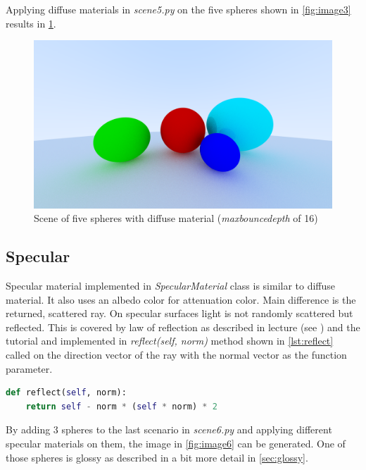 \documentclass[]{article}
\begin{document}
		Applying diffuse materials in \emph{scene5.py} on the five spheres shown in \cref{fig:image3} results in \cref{fig:image5}.
		
		\begin{figure}[h]
			\centering
			\includegraphics[width=0.9\linewidth]{image5-5}
			\caption{Scene of five spheres with diffuse material (\emph{max\textunderscore bounce\textunderscore depth} of 16)}
			\label{fig:image5}
		\end{figure}
		 
		\subsection{Specular}
		Specular material implemented in \emph{SpecularMaterial} class is similar to diffuse material. It also uses an albedo color for attenuation color. Main difference is the returned, scattered ray. On specular surfaces light is not randomly scattered but reflected. This is covered by law of reflection as described in lecture (see \cite{LECTURE}) and the tutorial and implemented in \emph{reflect(self, norm)} method shown in \cref{lst:reflect} called on the direction vector of the ray with the normal vector as the function parameter.
		
		\begin{lstlisting}[caption={Method for reflecting a vector on a normal vector}, language=Python, label=lst:reflect]
def reflect(self, norm):
	return self - norm * (self * norm) * 2
		\end{lstlisting}
		
		By adding 3 spheres to the last scenario in \emph{scene6.py} and applying different specular materials on them, the image in \cref{fig:image6} can be generated. One of those spheres is glossy as described in a bit more detail in \cref{sec:glossy}.
		
\end{document}
